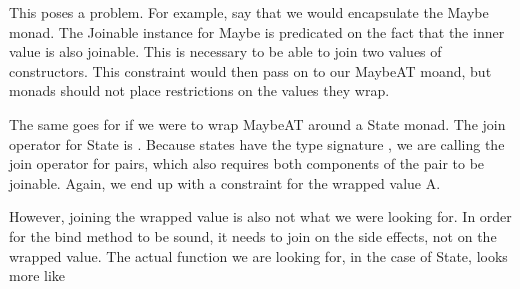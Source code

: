This poses a problem. For example, say that we would encapsulate the Maybe
monad. The Joinable instance for Maybe is predicated on the fact that the inner
value  is also joinable. This is necessary to be able to join two values of
 constructors. This constraint would then pass on to our MaybeAT
moand, but monads should not place restrictions on the values they wrap.

The same goes for if we were to wrap MaybeAT around a State monad. The join
operator for State is 
.
Because states have the type signature , we are calling the
join operator for pairs, which also requires both components of the pair to be
joinable. Again, we end up with a constraint for the wrapped value A.

However, joining the wrapped value is also not what we were looking for. In
order for the bind method to be sound, it needs to join on the side effects,
not on the wrapped value. The actual function we are looking for, in the case
of State, looks more like 
